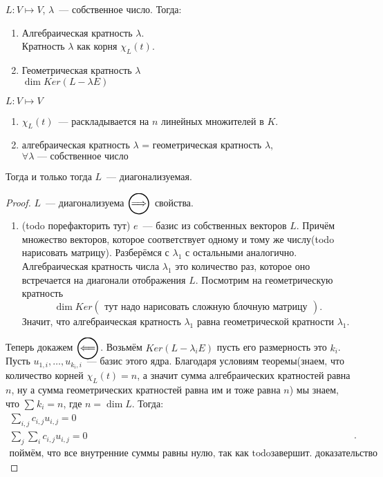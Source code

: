 \begin{definition}
    $L\colon V\mapsto V$, $\lambda$~--- собственное число. Тогда:
    \begin{enumerate}
        \item Алгебраическая кратность $\lambda$.\\
            Кратность  $\lambda$ как корня $\chi_L(t)$.
        \item Геометрическая кратность $\lambda$\\
            $\dim Ker(L-\lambda E)$
    \end{enumerate}
\end{definition}
\begin{theorem}
    $L\colon V\mapsto V$ 
    \begin{enumerate}
        \item $\chi_L(t)$~--- раскладывается на $n$ линейных множителей в $K$.
        \item алгебраическая кратность $\lambda$ = геометрическая кратность $\lambda$, $\forall\lambda\text{~--- собственное число}$ 
    \end{enumerate}
    Тогда и только тогда $L$~--- диагонализуемая.
\end{theorem}
\begin{proof}
    $L$~--- диагонализуема $\ora$ свойства.
    \begin{enumerate}
        \item 
            (todo порефакторить тут)
            $e$~--- базис из собственных векторов $L$. Причём множество векторов, которое соответствует одному
            и тому же числу(todo нарисовать матрицу). Разберёмся с $\lambda_1$ с остальными аналогично. Алгебраическая
            кратность числа $\lambda_1$ это количество раз, которое оно встречается на диагонали отображения $L$.
            Посмотрим на геометрическую кратность 
             \[
            \dim Ker
            \begin{pmatrix}
                \text{тут надо нарисовать сложную блочную матрицу}
            \end{pmatrix}
            .\] 
            Значит, что алгебраическая кратность $\lambda_1$ равна геометрической кратности $\lambda_1$.
    \end{enumerate}

    Теперь докажем $\ola$.
    Возьмём $Ker(L - \lambda_i E)$ пусть его размерность это  $k_i$. Пусть $u_{1,i},\dots,u_{k_i,i}$~--- базис этого
    ядра. Благодаря условиям теоремы(знаем, что количество корней
    $\chi_L(t) = n$, а значит сумма алгебраических кратностей равна $n$, ну а сумма 
    геометрических кратностей равна им и тоже равна $n$) мы знаем, что $\sum\limits_{}^{}{k_i} = n$, где $n = \dim L$.
    Тогда: 
    \[
        \begin{gathered}
            \sum\limits_{i,j}^{}{c_{i,j}u_{i,j}} = 0\\
            \sum\limits_{j}^{}{\sum\limits_{i}{c_{i,j}u_{i,j}}} = 0\\
            \text{поймём, что все внутренние суммы равны нулю, так как todo{завершит. доказательство}}
        \end{gathered}
    .\] 
\end{proof}
